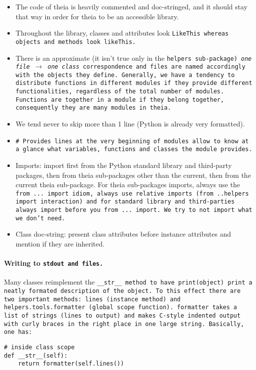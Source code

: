 \documentclass{article}
\begin{document}
\begin{itemize}
\item The code of theia is heavily commented and doc-stringed, and it should stay that way in order for theia to be an accessible library.

\item Throughout the library, classes and attributes look \tt{LikeThis} whereas objects and methods look \tt{likeThis}.

\item There is an approximate (it isn't true only in the \tt{helpers} sub-package) \textit{one file} $\rightarrow$ \textit{one class} correspondence and files are named accordingly with the objects they define. Generally, we have a tendency to distribute functions in different modules if they provide different functionalities, regardless of the total number of modules. Functions are together in a module if they belong together, consequently they are many modules in theia.

\item We tend never to skip more than 1 line (Python is already very formatted).

\item \tt{\# Provides} lines at the very beginning of modules allow to know at a glance what variables, functions and classes the module provides.

\item Imports: import first from the Python standard library and third-party packages, then from theia sub-packages other than the current, then from the current theia sub-package. For theia sub-packages imports, always use the \tt{from ... import} idiom, always use relative imports (\tt{from ..helpers import interaction}) and for standard library and third-parties always \tt{import} before you \tt{from ... import}. We try to not import what we don't need.

\item Class doc-string: present class attributes before instance attributes and mention if they are inherited.
\end{itemize}

\paragraph{Writing to \tt{stdout} and files.}Many classes reimplement the \tt{\_\_str\_\_} method to have \tt{print(object)} print a neatly formated description of the object. To this effect there are two important methods: \tt{lines} (instance method) and \tt{helpers.tools.formatter} (global scope function). \tt{formatter} takes a list of strings (lines to output) and makes C-style indented output with curly braces in the right place in one large string. Basically, one has:

\begin{lstlisting}
# inside class scope
def __str__(self):
	return formatter(self.lines())
	
\end{lstlisting}
\end{document}
